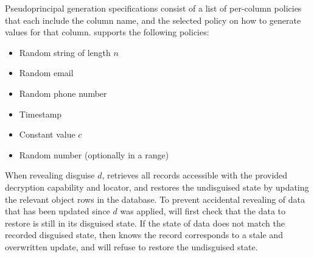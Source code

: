 Pseudoprincipal generation specifications consist of a list of per-column policies that each
include the column name, and the selected policy on how to generate values for that column.
\sys supports the following policies:
\begin{itemize}[nosep]
    \item Random string of length $n$
    \item Random email
    \item Random phone number
    \item Timestamp
    \item Constant value $c$
    \item Random number (optionally in a range)
\end{itemize}

When revealing disguise $d$, \sys retrieves all records accessible with the provided decryption capability
and locator, and restores the undisguised state by updating the relevant object rows in the database. 
To prevent accidental revealing of data that has been updated since $d$ was applied, 
\sys will first check that the data to restore is still in its disguised state. If the state of data does
not match the recorded disguised state, then \sys knows the record corresponds to a stale and
overwritten update, and will refuse to restore the undisguised state.


